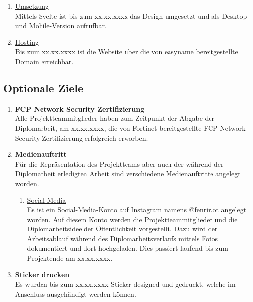 \documentclass[
	headings=optiontotocandhead,%
	oneside,
	numbers=noenddot,%
	toc=flat, %
	10pt, %
	parskip=full, %
	listof=totoc, %
	listof=flat, %
	numbers=noenddot, %
	bibliography=totoc, %
	a4paper,DIV=14,
]{scrartcl}
\begin{document}
\begin{enumerate}[start=1,label={\bfseries Ziel-H \arabic*},leftmargin=*,wide]
\begin{enumerate}[label=\alph*.]
\item{\underline{Umsetzung}}\\
Mittels Svelte ist bis zum xx.xx.xxxx das Design umgesetzt und als Desktop- und Mobile-Version aufrufbar.

\item{\underline{Hosting}}\\
Bis zum xx.xx.xxxx ist die Website über die von easyname bereitgestellte Domain erreichbar.
\end{enumerate}
\end{enumerate}

\subsection{Optionale Ziele}
\begin{enumerate}[start=1,label={\bfseries Ziel-O \arabic*},leftmargin=*,wide]
\item{\bfseries{FCP Network Security Zertifizierung}}\\
Alle Projektteammitglieder haben zum Zeitpunkt der Abgabe der Diplomarbeit, am xx.xx.xxxx, die von Fortinet bereitgestellte FCP Network Security Zertifizierung erfolgreich erworben.

\item{\bfseries{Medienauftritt}}\\
Für die Repräsentation des Projektteams aber auch der während der Diplomarbeit erledigten Arbeit sind verschiedene Medienauftritte angelegt worden.

\begin{enumerate}[label=\alph*.]
\item{\underline{Social Media}}\\
Es ist ein Social-Media-Konto auf Instagram namens @fenrir.ot angelegt worden. Auf diesem Konto werden die Projektteammitglieder und die Diplomarbeitsidee der Öffentlichkeit vorgestellt. Dazu wird der Arbeitsablauf während des Diplomarbeitsverlaufs mittels Fotos dokumentiert und dort hochgeladen. Dies passiert laufend bis zum Projektende am xx.xx.xxxx.
\end{enumerate}

\item{\bfseries{Sticker drucken}}\\
Es wurden bis zum xx.xx.xxxx Sticker designed und gedruckt, welche im Anschluss ausgehändigt werden können.
\end{enumerate}
\end{document}
